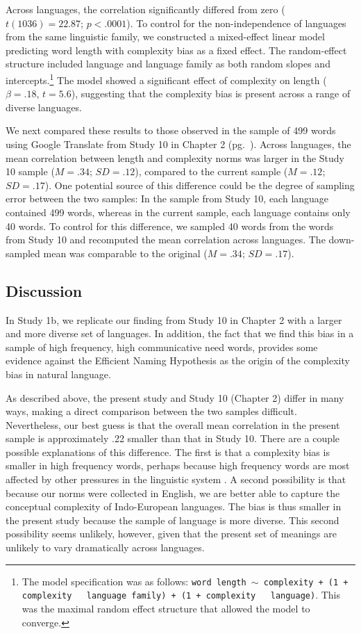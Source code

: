 Across languages,  the correlation significantly differed from zero ($ t(1036)= 22.87$; $p <.0001$).  To control for the non-independence of languages from the same linguistic family, we constructed a mixed-effect linear model predicting word length with complexity bias as a fixed effect. The random-effect structure included language and language family as both random slopes and intercepts.\footnote{The model specification was as follows: \texttt{word length $\sim$ complexity + (1 + complexity ~\textbar~language family) +  (1 + complexity ~\textbar~language)}. This was the maximal random effect structure that allowed the model to converge.}  The model showed a significant effect of complexity on length ($\beta = .18$, $t = 5.6$), suggesting that the complexity bias is present across a range of diverse languages.

We next compared these results to those observed in the sample of 499 words using Google Translate from Study 10 in Chapter 2 (pg.\ \pageref{ch2-10}). Across languages, the mean correlation between length and complexity norms was larger in the Study 10 sample ($M = .34$; $SD = .12$), compared to the current sample ($M = .12$; $SD = .17$). One potential source of this difference could be the degree of sampling error between the two samples: In the sample from Study 10, each language contained 499 words, whereas in the current sample, each language contains only 40 words. To control for this difference, we sampled 40 words from the words from Study 10 and recomputed  the mean correlation across languages. The down-sampled mean was comparable to the original  ($M = .34$; $SD = .17$). 

\subsection{Discussion}

In Study 1b, we replicate our finding from Study 10 in Chapter 2 with a larger and more diverse set of languages. In addition, the fact that we find this bias in a sample of high frequency, high communicative need words, provides some evidence against the Efficient Naming Hypothesis as the origin of the complexity bias in natural language.

As described above, the present study and Study 10 (Chapter 2) differ in many ways, making a direct comparison between the two samples difficult. Nevertheless, our best guess is that the overall mean correlation in the present sample is approximately .22  smaller than that in Study 10.  There are a couple possible explanations of this difference. The first is that a complexity bias is smaller in high frequency words, perhaps because high frequency words are most affected by other pressures in the linguistic system \cite{lieberman2007quantifying}. A second possibility is that because our norms were collected in English, we are better able to capture the conceptual complexity of Indo-European languages. The bias is thus smaller in the present study because the sample of language is more diverse.  This second possibility seems unlikely, however, given that the present set of meanings are unlikely to vary dramatically across languages. 


